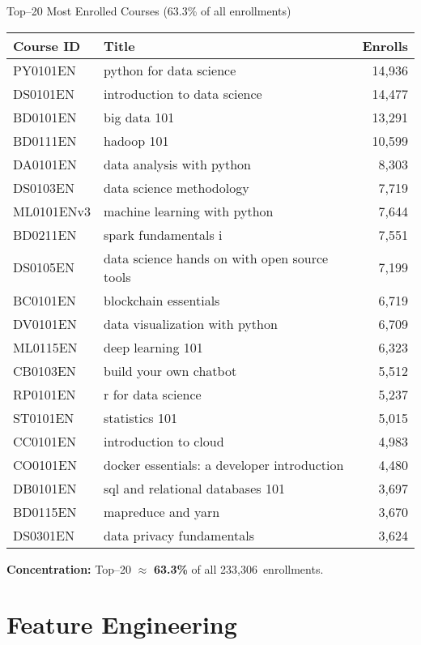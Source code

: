 \documentclass[aspectratio=169]{beamer}
\newcommand{\interactions}{233{,}306}
\begin{document}
\begin{frame}{Top–20 Most Enrolled Courses (63.3\% of all enrollments)}
\small
\begin{tabular}{@{}llr@{}}
\toprule
\textbf{Course ID} & \textbf{Title} & \textbf{Enrolls} \\
\midrule
PY0101EN & python for data science & 14{,}936 \\
DS0101EN & introduction to data science & 14{,}477 \\
BD0101EN & big data 101 & 13{,}291 \\
BD0111EN & hadoop 101 & 10{,}599 \\
DA0101EN & data analysis with python & 8{,}303 \\
DS0103EN & data science methodology & 7{,}719 \\
ML0101ENv3 & machine learning with python & 7{,}644 \\
BD0211EN & spark fundamentals i & 7{,}551 \\
DS0105EN & data science hands on with open source tools & 7{,}199 \\
BC0101EN & blockchain essentials & 6{,}719 \\
DV0101EN & data visualization with python & 6{,}709 \\
ML0115EN & deep learning 101 & 6{,}323 \\
CB0103EN & build your own chatbot & 5{,}512 \\
RP0101EN & r for data science & 5{,}237 \\
ST0101EN & statistics 101 & 5{,}015 \\
CC0101EN & introduction to cloud & 4{,}983 \\
CO0101EN & docker essentials: a developer introduction & 4{,}480 \\
DB0101EN & sql and relational databases 101 & 3{,}697 \\
BD0115EN & mapreduce and yarn & 3{,}670 \\
DS0301EN & data privacy fundamentals & 3{,}624 \\
\bottomrule
\end{tabular}

\medskip
\textbf{Concentration:} Top–20 \(\approx\) \textbf{63.3\%} of all \interactions\ enrollments.
\end{frame}

\section{Feature Engineering}
\end{document}
